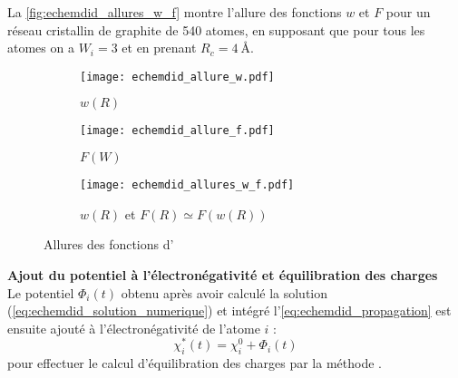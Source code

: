 La \autoref{fig:echemdid_allures_w_f} montre l'allure des fonctions $w$ et $F$ pour un réseau cristallin de graphite de \num{540} atomes, en supposant que pour tous les atomes on a $W_i = \num{3}$ et en prenant $R_c = \qty{4}{\angstrom}$.

\begin{figure}[h!]
    \centering
    \begin{subfigure}{\textwidth}
        \centering
        \texttt{[image: echemdid\_allure\_w.pdf]}
        \caption{$w(R)$}
    \end{subfigure}
    \begin{subfigure}{\textwidth}
        \centering
        \texttt{[image: echemdid\_allure\_f.pdf]}
        \caption{$F(W)$}
    \end{subfigure}
    \begin{subfigure}{\textwidth}
        \centering
        \texttt{[image: echemdid\_allures\_w\_f.pdf]}
        \caption{$w(R)$ et $F(R) \simeq F(w(R))$}
    \end{subfigure}
    \caption{Allures des fonctions d'\echemdid{}}
    \label{fig:echemdid_allures_w_f}
\end{figure}

\textbf{Ajout du potentiel à l'électronégativité et équilibration des charges}\\
Le potentiel $\Phi_i (t)$ obtenu après avoir calculé la solution (\ref{eq:echemdid_solution_numerique}) et intégré l'\autoref{eq:echemdid_propagation} est ensuite ajouté à l'électronégativité de l'atome $i$ :
\begin{equation*}
    \boxed%
    {
        \chi_i^* (t) = \chi_i^0 + \Phi_i (t)
    }
\end{equation*}
pour effectuer le calcul d'équilibration des charges par la méthode \qeq{}.
